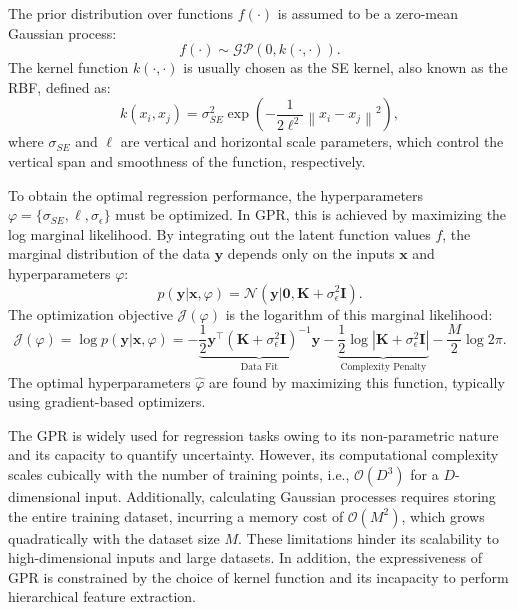 The prior distribution over functions $f(\cdot)$ is assumed to be a zero-mean Gaussian process:
\begin{equation}
    f(\cdot)\sim\mathcal{GP}(0, k(\cdot, \cdot)).
\end{equation}
The kernel function $k(\cdot,\cdot)$ is usually chosen as the \ac{SE} kernel, also known as the \ac{RBF}, defined as:
\begin{equation}
    k(x_i, x_j) = \sigma_{SE}^2\exp(-\frac{1}{2\ell^2}\left\| x_i - x_j\right\|^2),
\end{equation}
where $\sigma_{SE}$ and $\ell$ are vertical and horizontal scale parameters, which control the vertical span and smoothness of the function, respectively.

To obtain the optimal regression performance, the hyperparameters $\varphi = \{ \sigma_{SE}, \ell, \sigma_{\epsilon} \}$ must be optimized. In \ac{GPR}, this is achieved by maximizing the log marginal likelihood. By integrating out the latent function values $f$, the marginal distribution of the data $\boldsymbol{y}$ depends only on the inputs $\boldsymbol{x}$ and hyperparameters $\varphi$:
\begin{equation}
    p(\boldsymbol{y} | \boldsymbol{x}, \varphi) = \mathcal{N}(\boldsymbol{y} | \boldsymbol{0}, \boldsymbol{K} + \sigma_{\epsilon}^2 \boldsymbol{I}).
\end{equation}
The optimization objective $\mathcal{J}(\varphi)$ is the logarithm of this marginal likelihood:
\begin{equation}
    \mathcal{J}(\varphi) = \log p(\boldsymbol{y} | \boldsymbol{x}, \varphi) = -\underbrace{\frac{1}{2} \boldsymbol{y}^\top (\boldsymbol{K} + \sigma_{\epsilon}^2 \boldsymbol{I})^{-1} \boldsymbol{y}}_{\text{Data Fit}} - \underbrace{\frac{1}{2} \log | \boldsymbol{K} + \sigma_{\epsilon}^2 \boldsymbol{I} |}_{\text{Complexity Penalty}} - \frac{M}{2} \log 2\pi.
\end{equation}
The optimal hyperparameters $\hat{\varphi}$ are found by maximizing this function, typically using gradient-based optimizers.

The \ac{GPR} is widely used for regression tasks owing to its non-parametric nature and its capacity to quantify uncertainty. However, its computational complexity scales cubically with the number of training points, i.e., $\mathcal{O}(D^3)$ for a $D$-dimensional input. Additionally, calculating Gaussian processes requires storing the entire training dataset, incurring a memory cost of $\mathcal{O}(M^2)$, which grows quadratically with the dataset size $M$. These limitations hinder its scalability to high-dimensional inputs and large datasets. In addition, the expressiveness of \ac{GPR} is constrained by the choice of kernel function and its incapacity to perform hierarchical feature extraction.

